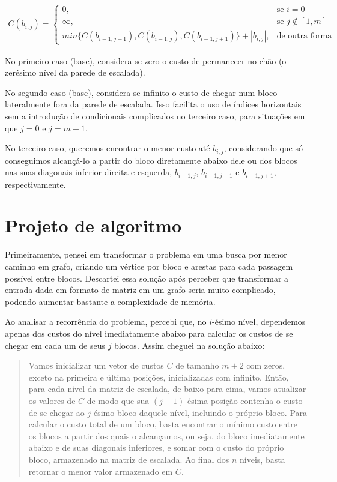 \documentclass[12pt,a4paper]{article}
\begin{document}
  \begin{align*}\label{recorrencia}
    C(b_{i,j}) = 
    \begin{cases}
      0,& \text{se } i = 0\\
      \infty,& \text{se } j \notin [1,m] \\
      min\{C(b_{i-1,j-1}),C(b_{i-1,j}),C(b_{i-1,j+1})\} + |b_{i,j}|,& \text{de outra forma}
    \end{cases}
  \end{align*}

  No primeiro caso (base), considera-se zero o custo de permanecer no chão (o zerésimo nível da parede de escalada).

  No segundo caso (base), considera-se infinito o custo de chegar num bloco lateralmente fora da parede de escalada. Isso facilita o uso de índices horizontais sem a introdução de condicionais complicados no terceiro caso, para situações em que $j = 0$ e $j = m+1$.

  No terceiro caso, queremos encontrar o menor custo até $b_{i,j}$, considerando que só conseguimos alcançá-lo a partir do bloco diretamente abaixo dele ou dos blocos nas suas diagonais inferior direita e esquerda, $b_{i-1,j}$, $b_{i-1,j-1}$ e $b_{i-1,j+1}$, respectivamente.

  \section{Projeto de algoritmo}
  Primeiramente, pensei em transformar o problema em uma busca por menor caminho em grafo, criando um vértice por bloco e arestas para cada passagem possível entre blocos. Descartei essa solução após perceber que transformar a entrada dada em formato de matriz em um grafo seria muito complicado, podendo aumentar bastante a complexidade de memória.

  Ao analisar a recorrência do problema, percebi que, no $i$-ésimo nível, dependemos apenas dos custos do nível imediatamente abaixo para calcular os custos de se chegar em cada um de seus $j$ blocos. Assim cheguei na solução abaixo:

  \begin{quote}
    Vamos inicializar um vetor de custos $C$ de tamanho $m+2$ com zeros, exceto na primeira e última posições, inicializadas com infinito. Então, para cada nível da matriz de escalada, de baixo para cima, vamos atualizar os valores de $C$ de modo que sua $(j+1)$-ésima posição contenha o custo de se chegar ao $j$-ésimo bloco daquele nível, incluindo o próprio bloco. Para calcular o custo total de um bloco, basta encontrar o mínimo custo entre os blocos a partir dos quais o alcançamos, ou seja, do bloco imediatamente abaixo e de suas diagonais inferiores, e somar com o custo do próprio bloco, armazenado na matriz de escalada. Ao final dos $n$ níveis, basta retornar o menor valor armazenado em $C$.
  \end{quote}
\end{document}
